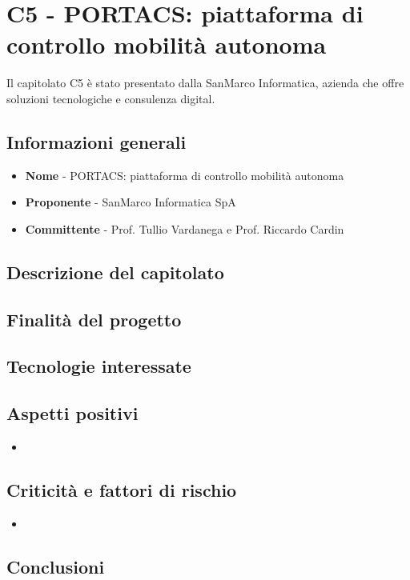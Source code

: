 \chapter{C5 - PORTACS: piattaforma di controllo mobilità autonoma}
Il capitolato C5 è stato presentato dalla SanMarco Informatica, azienda che offre soluzioni tecnologiche e consulenza digital.
\section{Informazioni generali}
\begin{itemize}
	\item \textbf{Nome} - PORTACS: piattaforma di controllo mobilità autonoma
	\item \textbf{Proponente} - SanMarco Informatica SpA
	\item \textbf{Committente} - Prof. Tullio Vardanega e Prof. Riccardo Cardin
\end{itemize}
\section{Descrizione del capitolato}
\section{Finalità del progetto}
\section{Tecnologie interessate}

\section{Aspetti positivi}
\begin{itemize}
	\item
\end{itemize}
\section{Criticità e fattori di rischio}
\begin{itemize}
	\item 
\end{itemize}
\section{Conclusioni}